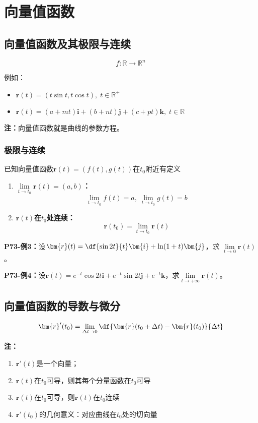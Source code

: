 \setcounter{chapter}{8}

\chapter{向量值函数}

\section{向量值函数及其极限与连续}

$$f:\mathbb{R}\to\mathbb{R}^n$$

例如：
\begin{itemize}
  \setlength{\itemindent}{1cm}
  \item $\bm{r}(t)=(t\sin t, t\cos t),\;t\in\mathbb{R}^+$ 
  \item
  $\bm{r}(t)=(a+mt)\bm{i}+(b+nt)\bm{j}+(c+pt)\bm{k},\;t\in\mathbb{R}$ 
\end{itemize}

{\bf 注：}向量值函数就是曲线的参数方程。

\subsection{极限与连续}

已知向量值函数$\bm{r}(t)=(f(t),g(t))$在$t_0$附近有定义 
\begin{enumerate}[(1)]
  \setlength{\itemindent}{1cm}
  \item {\bf $\lim\limits_{t\to t_0}\bm{r}(t)=(a,b)$：}
  $$\lim\limits_{t\to t_0}f(t)=a,\;\lim\limits_{t\to t_0}g(t)=b$$
  \item {\bf $\bm{r}(t)$在$t_0$处连续：}
  $$\bm{r}(t_0)=\lim\limits_{t\to t_0}\bm{r}(t)$$
\end{enumerate}

{\bf P73-例3：}设$\bm{r}(t)=\df{\sin 2t}{t}\bm{i}+\ln(1+t)\bm{j}$，求
$\lim\limits_{t\to 0}\bm{r}(t)$。

{\bf  P73-例4：}设$\bm{r}(t)=e^{-t}\cos 2t\bm{i}+e^{-t}\sin 2t
\bm{j}+e^{-t}\bm{k}$，求$\lim\limits_{t\to +\infty}\bm{r}(t)$。

\section{向量值函数的导数与微分}

$$\bm{r}'(t_0)=\lim\limits_{\Delta t\to 0}
\df{\bm{r}(t_0+\Delta t)-\bm{r}(t_0)}{\Delta t}$$

{\bf 注：}
\begin{enumerate}[(1)]
  \setlength{\itemindent}{1cm}
  \item $\bm{r}'(t)$是一个向量；
  \item $\bm{r}(t)$在$t_0$可导，则其每个分量函数在$t_0$可导
  \item $\bm{r}(t)$在$t_0$可导，则$\bm{r}(t)$在$t_0$连续 
  \item $\bm{r}'(t_0)$的几何意义：对应曲线在$t_0$处的切向量
\end{enumerate}

